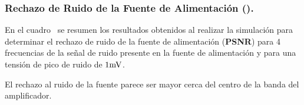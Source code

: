 


\clearpage

\subsubsection{Rechazo de Ruido de la Fuente de Alimentación (\textbf{}).}

En el cuadro~ se resumen los resultados obtenidos al realizar la simulación para determinar el rechazo de ruido de la fuente de alimentación (\textbf{PSNR}) para 4 frecuencias de la señal de ruido presente en la fuente de alimentación y para una tensión de pico de ruido de $1 \si[per-mode=symbol]{\milli\volt}$.



 
\begin{table}[H]  %
    
    \setlength\arrayrulewidth{1.5pt}
    \def\clinecolor{\hhline{|>{\arrayrulecolor{white}}-%
    >{\arrayrulecolor{white}}|-|-|-|-|-|-|}}
	\caption{\footnotesize{Rechazo de Ruido de la Fuente de Alimentación (\textbf{}).}}
	\label{table:table_PSNR}
\end{table}


El rechazo al ruido de la fuente parece ser mayor cerca del centro de la banda del amplificador.
